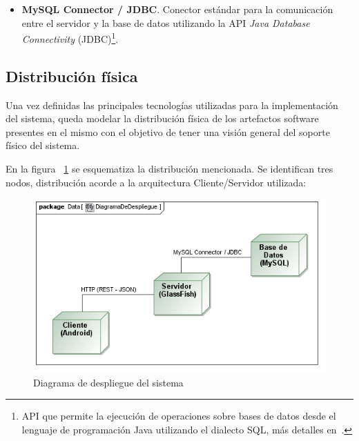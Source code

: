 \begin{itemize}
	\item{\textbf{MySQL Connector / JDBC}. Conector estándar para la comunicación entre el servidor y la base de datos utilizando la API \emph{Java Database Connectivity} (JDBC)\footnote{API que permite la ejecución de operaciones sobre bases de datos desde el lenguaje de programación Java utilizando el dialecto SQL, más detalles en~\cite{OraDB}.}.}

\end{itemize}

\subsection{Distribución física}

Una vez definidas las principales tecnologías utilizadas para la implementación del sistema, queda modelar la distribución física de los artefactos software presentes en el mismo con el objetivo de tener una visión general del soporte físico del sistema.

En la figura ~\ref{fig:diagramaDespliegue} se esquematiza la distribución mencionada. Se identifican tres nodos, distribución acorde a la arquitectura Cliente/Servidor utilizada:

\begin{figure}
	\centering
	\includegraphics[width=\linewidth,height=\textheight,keepaspectratio]{Images/Diagramas/09_DiagramaDeDespliegue}
	\caption{Diagrama de despliegue del sistema}
	\label{fig:diagramaDespliegue}
\end{figure}

